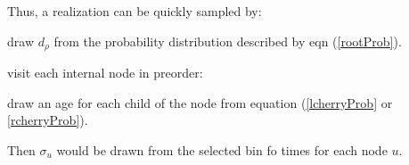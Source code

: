 \documentclass{llncs}
\newcommand{\contTime}[1]{\ensuremath{\sigma}_{#1}\xspace}
\newcommand{\rootNode}[0]{\rho}
\begin{document}
Thus, a realization can be quickly sampled by:
\begin{compactenum}
    \item draw $d_{\rootNode}$ from the probability distribution described by eqn (\ref{rootProb}).
    \item visit each internal node in preorder:
    \begin{compactenum}
        \item draw an age for each  child of the node from equation (\ref{lcherryProb} or \ref{rcherryProb}).
    \end{compactenum}
\end{compactenum}

Then $\contTime{u}$ would be drawn from the selected bin fo times for each node $u$.

\newpage
\end{document}
